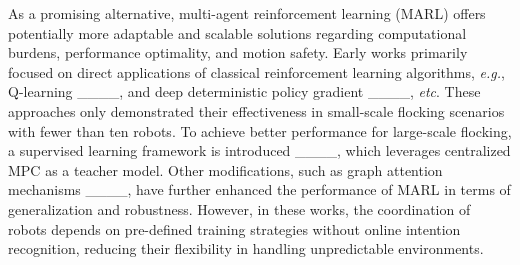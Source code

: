 
As a promising alternative, multi-{agent} reinforcement learning (MARL) offers potentially more adaptable and scalable solutions regarding computational burdens, performance optimality, and motion safety. Early works primarily focused on direct applications of classical reinforcement learning algorithms, \emph{e.g.}, Q-learning %
____, and deep deterministic policy gradient ____, \emph{etc}. These approaches only demonstrated their effectiveness in small-scale flocking scenarios with fewer than ten robots. To achieve better performance for large-scale flocking, a supervised learning framework is introduced ____, which leverages centralized MPC as a teacher model.  Other modifications, such as 
graph attention mechanisms ____, have further enhanced the performance of MARL in terms of generalization and robustness. 
However, in these works, the coordination of robots depends on pre-defined training strategies without online intention recognition, reducing their flexibility in handling unpredictable environments.


